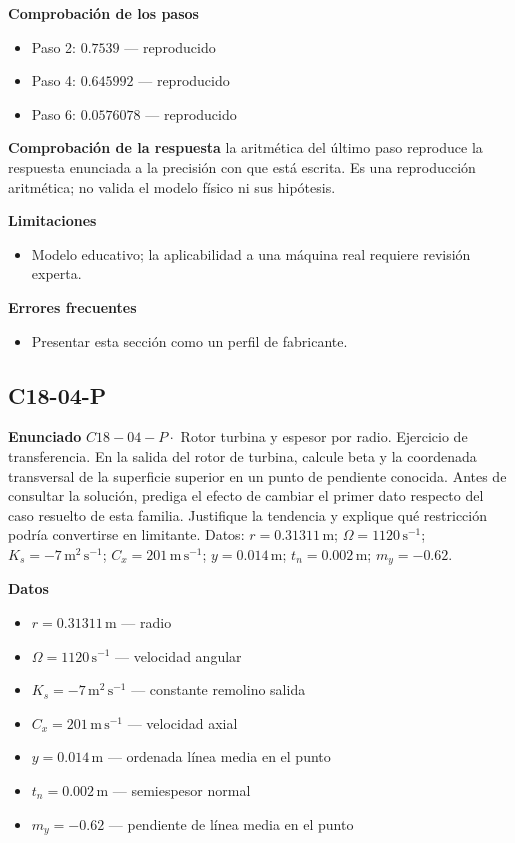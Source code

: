 \documentclass[10pt,openany]{book}
\begin{document}
\noindent\textbf{Comprobación de los pasos}
\begin{itemize}
\item Paso 2: $0.7539$ — reproducido
\item Paso 4: $0.645992$ — reproducido
\item Paso 6: $0.0576078$ — reproducido
\end{itemize}

\noindent\textbf{Comprobación de la respuesta} la aritmética del último paso reproduce la respuesta enunciada a la precisión con que está escrita. Es una reproducción aritmética; no valida el modelo físico ni sus hipótesis.

\noindent\textbf{Limitaciones}
\begin{itemize}
\item Modelo educativo; la aplicabilidad a una máquina real requiere revisión experta.
\end{itemize}

\noindent\textbf{Errores frecuentes}
\begin{itemize}
\item Presentar esta sección como un perfil de fabricante.
\end{itemize}
\subsection*{C18-04-P}

\noindent\textbf{Enunciado}
\(C18-04-P \cdot\) Rotor turbina y espesor por radio. Ejercicio de transferencia. En la salida del rotor de turbina, calcule beta y la coordenada transversal de la superficie superior en un punto de pendiente conocida. Antes de consultar la solución, prediga el efecto de cambiar el primer dato respecto del caso resuelto de esta familia. Justifique la tendencia y explique qué restricción podría convertirse en limitante. Datos: \(r=0.31311\, \mathrm{m}\); \(\Omega=1120\, \mathrm{s}^{-1}\); \(K_s=-7\, \mathrm{m}^{2}\,\mathrm{s}^{-1}\); \(C_x=201\, \mathrm{m}\,\mathrm{s}^{-1}\); \(y=0.014\, \mathrm{m}\); \(t_n=0.002\, \mathrm{m}\); \(m_y=-0.62\).

\noindent\textbf{Datos}
\begin{itemize}
\item $r = 0.31311\,\mathrm{m}$ — radio
\item $\Omega = 1120\,\mathrm{s}^{-1}$ — velocidad angular
\item $K_s = -7\,\mathrm{m}^{2}\,\mathrm{s}^{-1}$ — constante remolino salida
\item $C_x = 201\,\mathrm{m}\,\mathrm{s}^{-1}$ — velocidad axial
\item $y = 0.014\,\mathrm{m}$ — ordenada línea media en el punto
\item $t_n = 0.002\,\mathrm{m}$ — semiespesor normal
\item $m_y = -0.62$ — pendiente de línea media en el punto
\end{itemize}
\end{document}
